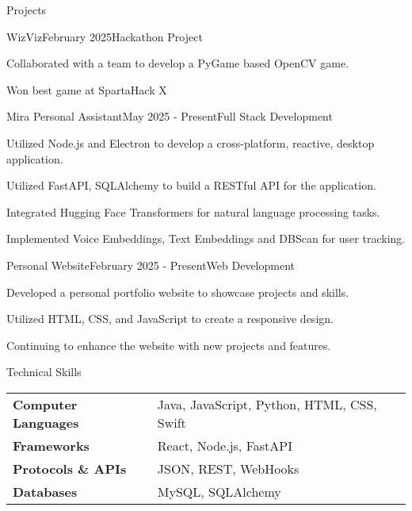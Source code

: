 \documentclass[
	11pt
]{resume}
\begin{document}
	\begin{rSection}{Projects}

		\begin{rSectionEntry}{WizViz}{February 2025}{Hackathon Project}{}
			\item Collaborated with a team to develop a PyGame based OpenCV game.
			\item Won best game at SpartaHack X
		\end{rSectionEntry}

		\begin{rSectionEntry}{Mira Personal Assistant}{May 2025 - Present}{Full Stack Development}{}
			\item Utilized Node.js and Electron to develop a cross-platform, reactive, desktop application.
			\item Utilized FastAPI, SQLAlchemy to build a RESTful API for the application.
			\item Integrated Hugging Face Transformers for natural language processing tasks.
			\item Implemented Voice Embeddings, Text Embeddings and DBScan for user tracking.
		\end{rSectionEntry}

		\begin{rSectionEntry}{Personal Website}{February 2025 - Present}{Web Development}{}
			\item Developed a personal portfolio website to showcase projects and skills.
			\item Utilized HTML, CSS, and JavaScript to create a responsive design.
			\item Continuing to enhance the website with new projects and features.
		\end{rSectionEntry}

	\end{rSection}

	\begin{rSection}{Technical Skills}

		\begin{tabular}{@{} >{\bfseries}l @{\hskip 6ex} l @{}}
			Computer Languages & Java, JavaScript, Python, HTML, CSS, Swift \\
			Frameworks & React, Node.js, FastAPI \\
			Protocols \& APIs & JSON, REST, WebHooks \\
			Databases & MySQL, SQLAlchemy \\
		\end{tabular}

	\end{rSection}
\end{document}
